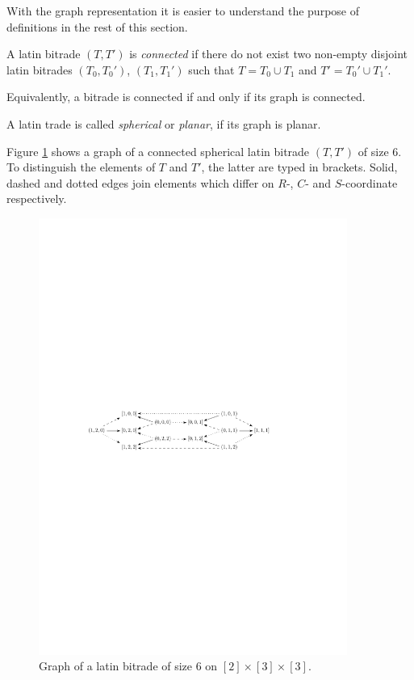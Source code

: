 With the graph representation it is easier to understand the purpose of definitions in the rest of this section.

\begin{defn}
A latin bitrade $(T,T')$ is \emph{connected} if there do not exist two non-empty disjoint latin bitrades $(T_0,T_0')$, $(T_1,T_1')$ such that $T = T_0 \cup T_1$ and $T' = T_0' \cup T_1'$.

Equivalently, a bitrade is connected if and only if its graph is connected.
\end{defn}

\begin{defn}
A latin trade is called \emph{spherical} or \emph{planar}, if its graph is planar.
\end{defn}

\begin{exmp}
\label{exmp:graph-bitrade}
Figure \ref{fig:graph-bitrade} shows a graph of a connected spherical latin bitrade $(T,T')$ of size 6. To distinguish the elements of $T$ and $T'$, the latter are typed in brackets. Solid, dashed and dotted edges join elements which differ on $R$-, $C$- and $S$-coordinate respectively.

\begin{figure}[htb]
\centering
\includegraphics[width=0.9\textwidth]{img/graph_example.pdf}
\caption{Graph of a latin bitrade of size 6 on $[2] \times [3] \times [3]$.}
\label{fig:graph-bitrade}
\end{figure}
\end{exmp}%

